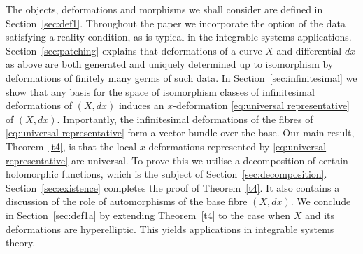 \documentclass[11pt,twoside]{amsart}
\theoremstyle{plain}
\newcommand{\dfx}{dx}
\begin{document}
The objects, deformations and morphisms we shall consider are defined in Section~\ref{sec:def1}. Throughout the paper we incorporate the option of the data satisfying a reality condition, as is typical in the integrable systems applications. Section~\ref {sec:patching} explains that deformations of a curve $ X $ and differential $ \dfx $ as above are both generated and uniquely determined up to isomorphism by deformations of finitely many germs  of such data. In Section~\ref{sec:infinitesimal} we show that any basis for the space of isomorphism classes of infinitesimal deformations of $ (X,\dfx) $ induces an $x$-deformation \eqref {eq:universal representative} of $(X,\dfx)$. Importantly, the infinitesimal deformations of the fibres of \eqref {eq:universal representative} form a vector bundle over the base. Our main result, Theorem~\ref {t4}, is that the local $x$-deformations represented by \eqref {eq:universal representative} are universal. To prove this we utilise a decomposition of certain holomorphic functions, which is the subject of Section~\ref{sec:decomposition}.  Section~\ref {sec:existence} completes the proof of Theorem~\ref {t4}. It also contains a discussion of the role of automorphisms of the base fibre $ (X, \dfx) $. We conclude in Section~\ref{sec:def1a} by extending Theorem~\ref {t4} to the case when $ X $ and its deformations are hyperelliptic. This yields applications in integrable systems theory. %
\end{document}
